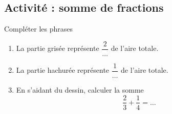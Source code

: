 
\subsection*{Activité : somme de fractions}

Compléter les phrases
\begin{center}
   
\end{center}
\begin{enumerate}
    \item
        La partie grisée représente \( \dfrac{ 2 }{ \ldots }\) de l'aire totale.
    \item
        La partie hachurée représente \( \dfrac{ 1 }{ \ldots }\) de l'aire totale.
    \item
        En s'aidant du dessin, calculer la somme
        \begin{equation}
            \frac{ 2 }{ 3 }+\frac{1}{ 4 }=\ldots
        \end{equation}
\end{enumerate}
